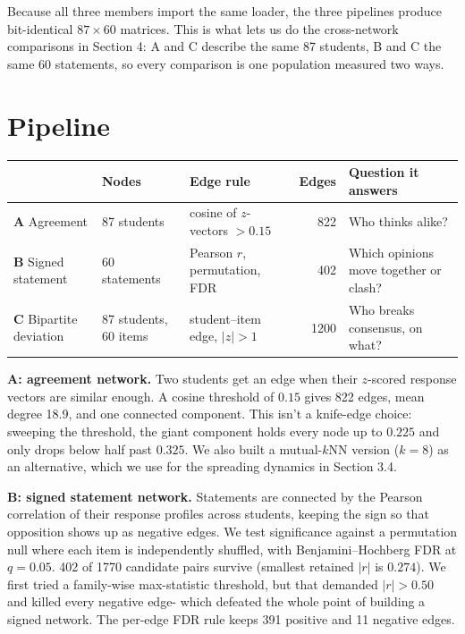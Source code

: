 \documentclass[10pt,a4paper]{article}
\begin{document}
Because all three members import the same loader, the three pipelines produce
bit-identical $87 \times 60$ matrices. This is what lets us do the cross-network
comparisons in Section 4: A and C describe the same 87 students, B and C the same 60
statements, so every comparison is one population measured two ways.

\section{Pipeline}

\begin{table}[h]
\centering
\footnotesize
\setlength{\tabcolsep}{4pt}
\begin{tabular}{@{}lllrl@{}}
\toprule
& \textbf{Nodes} & \textbf{Edge rule} & \textbf{Edges} & \textbf{Question it answers} \\
\midrule
\textbf{A} Agreement & 87 students & cosine of $z$-vectors $>0.15$ & 822 & Who thinks alike? \\
\textbf{B} Signed statement & 60 statements & Pearson $r$, permutation, FDR & 402 & Which opinions move together or clash? \\
\textbf{C} Bipartite deviation & 87 students, 60 items & student--item edge, $|z|>1$ & 1200 & Who breaks consensus, on what? \\
\bottomrule
\end{tabular}
\setlength{\tabcolsep}{6pt}
\end{table}

\textbf{A: agreement network.} Two students get an edge when their $z$-scored
response vectors are similar enough. A cosine threshold of $0.15$ gives 822 edges,
mean degree 18.9, and one connected component. This isn't a knife-edge choice:
sweeping the threshold, the giant component holds every node up to $0.225$ and only
drops below half past $0.325$. We also built a mutual-$k$NN version ($k=8$) as an
alternative, which we use for the spreading dynamics in Section 3.4.

\textbf{B: signed statement network.} Statements are connected by the Pearson
correlation of their response profiles across students, keeping the sign so that
opposition shows up as negative edges. We test significance against a permutation null
where each item is independently shuffled, with Benjamini--Hochberg FDR at $q=0.05$.
402 of 1770 candidate pairs survive (smallest retained $|r|$ is $0.274$). We first tried
a family-wise max-statistic threshold, but that demanded $|r| > 0.50$ and killed
every negative edge- which defeated the whole point of building a signed network.
The per-edge FDR rule keeps 391 positive and 11 negative edges.
\end{document}
